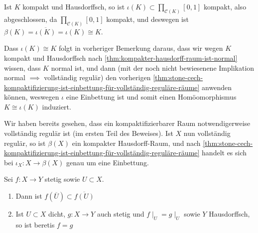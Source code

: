 \begin{remark}
    Ist $K$ kompakt und Hausdorffsch, so ist  $ι(K) \subset \prod_{\mathcal{C}(K)} [0,1]$ kompakt, also abgeschlossen, da $\prod_{\mathcal{C}(K)} [0,1]$ kompakt, und deswegen ist $β(K) = \overline{ι(K)} = ι(K) \cong K$.
\end{remark}
\begin{remark*}
    Dass $ι(K) \cong K$ folgt in vorheriger Bemerkung daraus, dass wir wegen  $K$ kompakt und Hausdorffsch nach \autoref{thm:kompakter-hausdorff-raum-ist-normal} wissen, dass $K$ normal ist, und dann (mit der noch nicht bewiesenene Implikation normal  $\implies$ vollständig regulär) den vorherigen \autoref{thm:stone-cech-kompaktifizierung-ist-einbettung-für-vollständig-reguläre-räume} anwenden können, weswegen $ι$ eine Einbettung ist und somit einen Homöomorphismus  $K \cong ι(K)$ induziert.
\end{remark*}
\begin{proof*}
    Wir haben bereits gesehen, dass ein kompaktifizierbarer Raum notwendigerweise vollständig regulär ist (im ersten Teil des Beweises). Ist $X$ nun vollständig regulär, so ist  $β(X)$ ein kompakter Hausdorff-Raum, und nach \autoref{thm:stone-cech-kompaktifizierung-ist-einbettung-für-vollständig-reguläre-räume} handelt es sich bei $ι_X : X \to  β(X)$ genau um eine Einbettung.
\end{proof*}
\begin{lemma}\label{lm:fortsetzung-stetiger-funktionen-in-dichten-hausdorff-räumen-sind-eindeutig}
   Sei $f: X \to  Y$ stetig sowie $U\subset X$.
   \begin{enumerate}[1)]
       \item Dann ist $f(\overline{U}) \subset \overline{f(U)}$ 
       \item Ist $U\subset X$ dicht, $g: X\to Y$ auch stetig und $f\mid _ U = g\mid _U$ sowie $Y$ Hausdorffsch, so ist beretis  $f=g$
   \end{enumerate}
\end{lemma}
